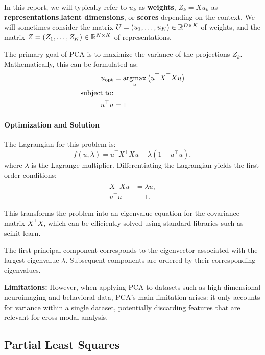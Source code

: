 In this report, we will typically refer to $u_k$ as \textbf{weights}, $Z_k = X u_k$ as \textbf{representations},\textbf{latent
dimensions}, or \textbf{scores} depending on the context. We will sometimes consider the matrix $U = \left(u_1, \dots, u_K\right) \in \mathbb{R}^{D \times K}$ of weights, and the matrix $Z = \left(Z_1, \dots, Z_K\right) \in \mathbb{R}^{N \times K}$ of representations.

The primary goal of PCA is to maximize the variance of the projections \(Z_k\). Mathematically, this can be formulated
as:
\begin{align}
    u_{\text{opt}} &= \underset{u}{\text{argmax}} \left( u^\top X^\top Xu \right) \\
    \text{subject to:} \notag \\
    u^\top u &= 1 \notag
\end{align}

\paragraph{Optimization and Solution}
The Lagrangian for this problem is:
\begin{equation}
    f(u,\lambda) = u^\top X^\top Xu + \lambda(1 - u^\top u),
\end{equation}
where \(\lambda\) is the Lagrange multiplier. Differentiating the Lagrangian yields the first-order conditions:
\begin{align}
    X^\top X u &= \lambda u, \\
    u^\top u &= 1.
\end{align}

This transforms the problem into an eigenvalue equation for the covariance matrix \(X^\top X\), which can be efficiently solved using standard libraries such as scikit-learn\cite{pedregosa2011scikit}.

The first principal component corresponds to the eigenvector associated with the largest eigenvalue \(\lambda\). Subsequent components are ordered by their corresponding eigenvalues.

\textbf{Limitations: }However, when applying PCA to datasets such as high-dimensional neuroimaging and behavioral
data, PCA's main limitation arises: it only accounts for variance within a single dataset, potentially discarding features that are relevant for cross-modal analysis.

\subsection{Partial Least Squares}


